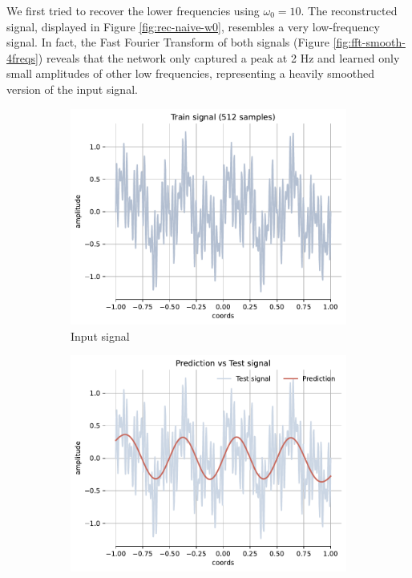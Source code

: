 We first tried to recover the lower frequencies using $\omega_0=10$. The reconstructed signal, displayed in Figure \ref{fig:rec-naive-w0}, resembles a very low-frequency signal. In fact, the Fast Fourier Transform of both signals (Figure \ref{fig:fft-smooth-4freqs}) reveals that the network only captured a peak at 2 Hz and learned only small amplitudes of other low frequencies, representing a heavily smoothed version of the input signal.

\begin{figure}[h!]
    \centering
    \begin{subfigure}[b]{0.32\textwidth}
        \centering
        \includegraphics[width=\textwidth]{img/ch4/train_tones512.pdf}
        \caption{Input signal}
        \label{fig:gt-4freqs}
    \end{subfigure}
    \hfill
    \begin{subfigure}[b]{0.32\textwidth}
        \centering
        \includegraphics[width=\textwidth]{img/ch4/prediction_w10_smoothed.pdf}

\end{subfigure}
\end{figure}
